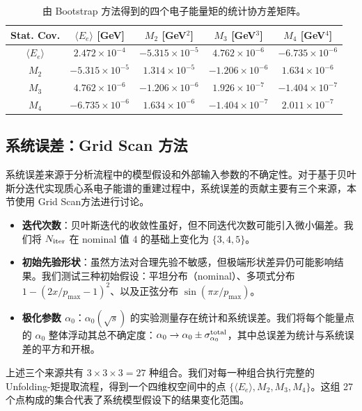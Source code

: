\begin{table}[htbp]
    \centering
    \caption{由 Bootstrap 方法得到的四个电子能量矩的统计协方差矩阵。}
    \label{tab:stat_cov}
    \begin{tabular}{c cccc}
        \toprule
        Stat. Cov. & $\langle E_e\rangle$ [GeV] & $M_2$ [GeV$^2$] & $M_3$ [GeV$^3$] & $M_4$ [GeV$^4$] \\
        \midrule
        $\langle E_e\rangle$ & $2.472\times10^{-4}$ & $-5.315\times10^{-5}$ & $4.762\times10^{-6}$ & $-6.735\times10^{-6}$ \\
        $M_2$ & $-5.315\times10^{-5}$ & $1.314\times10^{-5}$ & $-1.206\times10^{-6}$ & $1.634\times10^{-6}$ \\
        $M_3$ & $4.762\times10^{-6}$ & $-1.206\times10^{-6}$ & $1.926\times10^{-7}$ & $-1.404\times10^{-7}$ \\
        $M_4$ & $-6.735\times10^{-6}$ & $1.634\times10^{-6}$ & $-1.404\times10^{-7}$ & $2.011\times10^{-7}$ \\
        \bottomrule
    \end{tabular}
\end{table}
\subsection{系统误差：Grid Scan 方法}\label{sec:gridscan}
系统误差来源于分析流程中的模型假设和外部输入参数的不确定性。对于基于贝叶斯分迭代实现质心系电子能谱的重建过程中，系统误差的贡献主要有三个来源，本节使用 Grid Scan方法进行讨论。
    \begin{itemize}
        \item \textbf{迭代次数}：贝叶斯迭代的收敛性虽好，但不同迭代次数可能引入微小偏差。我们将 $N_{\rm iter}$ 在 nominal 值 4 的基础上变化为 $\{3, 4, 5\}$。
        \item \textbf{初始先验形状}：虽然方法对合理先验不敏感，但极端形状差异仍可能影响结果。我们测试三种初始假设：平坦分布（nominal）、多项式分布 $1-(2x/p_{\max}-1)^2$、以及正弦分布 $\sin(\pi x/p_{\max})$。
        \item \textbf{极化参数 $\alpha_0$}：$\alpha_0(\sqrt{s})$ 的实验测量存在统计和系统误差。我们将每个能量点的 $\alpha_0$ 整体浮动其总不确定度：$\alpha_0 \to \alpha_0 \pm \sigma_{\alpha_0}^{\rm total}$，其中总误差为统计与系统误差的平方和开根。
    \end{itemize}
上述三个来源共有 $3 \times 3 \times 3 = 27$ 种组合。我们对每一种组合执行完整的 Unfolding-矩提取流程，得到一个四维权空间中的点 $\{\langle E_e \rangle, M_2, M_3, M_4\}$。这组 27 个点构成的集合代表了系统模型假设下的结果变化范围。


